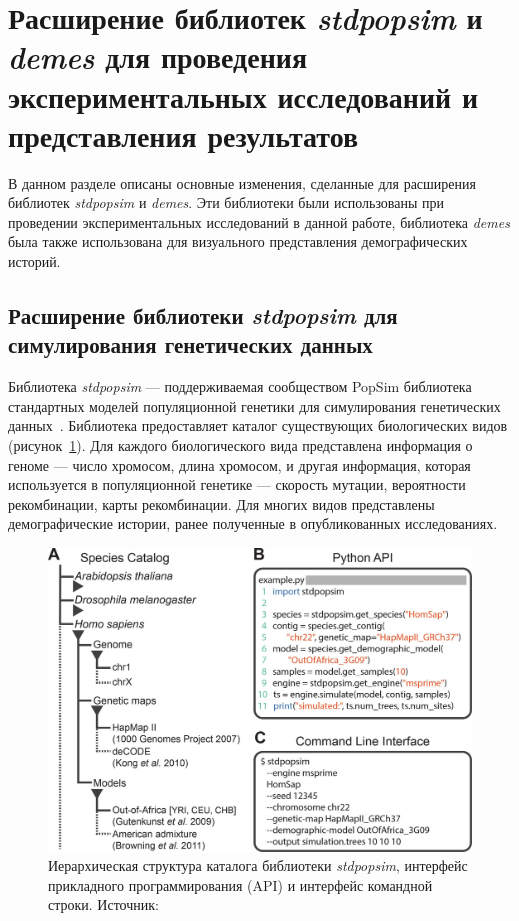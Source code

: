 \FloatBarrier
\section{Расширение библиотек \textit{stdpopsim} и \textit{demes} для проведения экспериментальных исследований и представления результатов}

В данном разделе описаны основные изменения, сделанные для расширения библиотек \textit{stdpopsim} и \textit{demes}.
Эти библиотеки были использованы при проведении экспериментальных исследований в данной работе, библиотека \textit{demes} была также использована для визуального представления демографических историй.

\subsection{Расширение библиотеки \textit{stdpopsim} для симулирования генетических данных}

Библиотека \textit{stdpopsim} --- поддерживаемая сообществом PopSim библиотека стандартных моделей популяционной генетики для симулирования генетических данных~\cite{adrion2020community,lauterbur2023expanding}.
Библиотека предоставляет каталог существующих биологических видов (рисунок~\ref{fig:part5:stdpopsim}).
Для каждого биологического вида представлена информация о геноме --- число хромосом, длина хромосом, и другая информация, которая используется в популяционной генетике --- скорость мутации, вероятности рекомбинации, карты рекомбинации.
Для многих видов представлены демографические истории, ранее полученные в опубликованных исследованиях.

\begin{figure}[ht]
    \centering
    \includegraphics[width=0.9\linewidth]{images/part5/stdpopsim.jpg}
    \caption{Иерархическая структура каталога библиотеки \textit{stdpopsim}, интерфейс прикладного программирования (API) и интерфейс командной строки. Источник:~\cite{adrion2020community}}
    \label{fig:part5:stdpopsim}
\end{figure}

